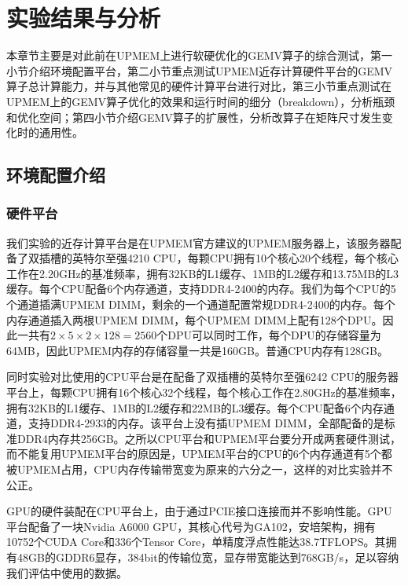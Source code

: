\chapter{实验结果与分析}
本章节主要是对此前在UPMEM上进行软硬优化的GEMV算子的综合测试，第一小节介绍环境配置平台，第二小节重点测试UPMEM近存计算硬件平台的GEMV算子总计算能力，并与其他常见的硬件计算平台进行对比，第三小节重点测试在UPMEM上的GEMV算子优化的效果和运行时间的细分（breakdown），分析瓶颈和优化空间；第四小节介绍GEMV算子的扩展性，分析改算子在矩阵尺寸发生变化时的通用性。

\section{环境配置介绍}

\subsection{硬件平台}
我们实验的近存计算平台是在UPMEM官方建议的UPMEM服务器上，该服务器配备了双插槽的英特尔至强4210 CPU，每颗CPU拥有10个核心20个线程，每个核心工作在2.20GHz的基准频率，拥有32KB的L1缓存、1MB的L2缓存和13.75MB的L3缓存。每个CPU配备6个内存通道，支持DDR4-2400的内存。我们为每个CPU的5个通道插满UPMEM DIMM，剩余的一个通道配置常规DDR4-2400的内存。每个内存通道插入两根UPMEM DIMM，每个UPMEM DIMM上配有128个DPU。因此一共有$2\times 5\times 2\times 128=2560$个DPU可以同时工作，每个DPU的存储容量为64MB，因此UPMEM内存的存储容量一共是160GB。普通CPU内存有128GB。

同时实验对比使用的CPU平台是在配备了双插槽的英特尔至强6242 CPU的服务器平台上，每颗CPU拥有16个核心32个线程，每个核心工作在2.80GHz的基准频率，拥有32KB的L1缓存、1MB的L2缓存和22MB的L3缓存。每个CPU配备6个内存通道，支持DDR4-2933的内存。该平台上没有插UPMEM DIMM，全部配备的是标准DDR4内存共256GB。之所以CPU平台和UPMEM平台要分开成两套硬件测试，而不能复用UPMEM平台的原因是，UPMEM平台的CPU的6个内存通道有5个都被UPMEM占用，CPU内存传输带宽变为原来的六分之一，这样的对比实验并不公正。

GPU的硬件装配在CPU平台上，由于通过PCIE接口连接而并不影响性能。GPU平台配备了一块Nvidia A6000 GPU，其核心代号为GA102，安培架构，拥有10752个CUDA Core和336个Tensor Core，单精度浮点性能达38.7TFLOPS。其拥有48GB的GDDR6显存，384bit的传输位宽，显存带宽能达到768GB/s，足以容纳我们评估中使用的数据。

